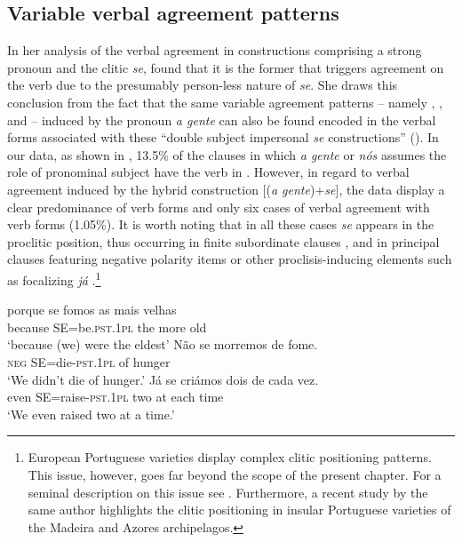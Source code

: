 \documentclass[output=paper]{langscibook}
\begin{document}
\subsection{Variable verbal agreement patterns}\label{sec:henriques:5.2}

In her analysis of the verbal agreement in constructions comprising a strong pronoun and the clitic \textit{se}, \citet[185]{Martins2009} found that it is the former that triggers agreement on the verb due to the presumably person-less nature of \textit{se}. She draws this conclusion from the fact that the same variable agreement patterns  -- namely , , and  --  induced by the pronoun \textit{a gente} can also be found encoded in the verbal forms associated with these “double subject impersonal \textit{se} constructions” (\citealt[185–186]{Martins2009}). In our data, as shown in , 13.5\% of the clauses in which \textit{a gente} or \textit{nós} assumes the role of pronominal subject have the verb in . However, in regard to verbal agreement induced by the hybrid construction [(\textit{a gente})+\textit{se}], the data display a clear predominance of  verb forms and only six cases of verbal agreement with  verb forms (1.05\%). It is worth noting that in all these cases \textit{se} appears in the proclitic position, thus occurring in finite subordinate clauses , and in principal clauses featuring negative polarity items  or other proclisis-inducing elements such as focalizing \textit{já} .\footnote{European Portuguese varieties display complex clitic positioning patterns. This issue, however, goes far beyond the scope of the present chapter. For a seminal description on this issue see \citet{Martins2016b}. Furthermore, a recent study by the same author \citep{Martins2021} highlights the clitic positioning in insular Portuguese varieties of the Madeira and Azores archipelagos.}

\ea\label{ex:henriques:28}
 \gll porque {se fomos} as mais velhas\\
         because SE=be.\textsc{pst.1pl} the more old\\
 \glt `because (we) were the eldest'
\ex\label{ex:henriques:29}
 \gll Não {se morremos} de fome.\\
         \textsc{neg} SE=die-\textsc{pst.1pl} of hunger\\
 \glt `We didn't die of hunger.'
\ex\label{ex:henriques:30}
 \gll Já {se criámos} dois de cada vez.\\
         even SE=raise-\textsc{pst.1pl} two at each time\\
 \glt `We even raised two at a time.'
\z 
\end{document}

